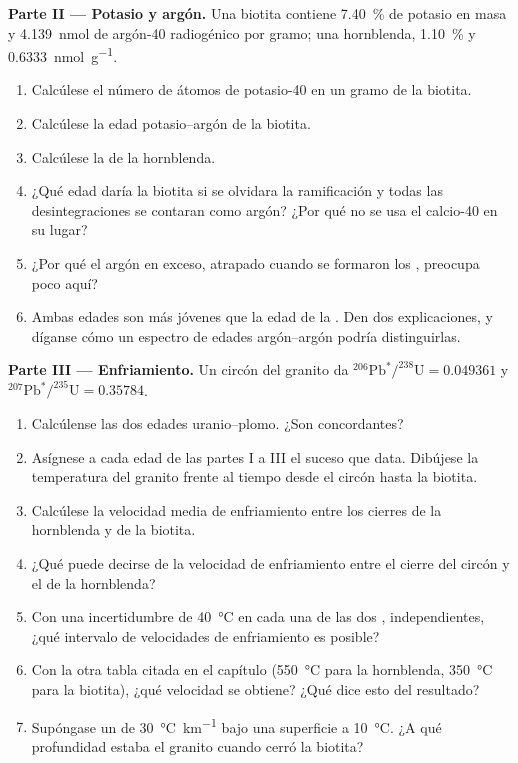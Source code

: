 \begin{problem}
\noindent\textbf{Parte II --- Potasio y argón.} Una biotita contiene
\qty{7.40}{\percent} de potasio en masa y \qty{4.139}{nmol} de argón-40 radiogénico
por gramo; una hornblenda, \qty{1.10}{\percent} y \qty{0.6333}{nmol.g^{-1}}.
\begin{enumerate}[resume]
  \item Calcúlese el número de átomos de potasio-40 en un gramo de la biotita.
  \item Calcúlese la edad potasio--argón de la biotita.
  \item Calcúlese la de la hornblenda.
  \item ¿Qué edad daría la biotita si se olvidara la ramificación y todas las
        desintegraciones se contaran como argón? ¿Por qué no se usa el calcio-40 en su lugar?
  \item ¿Por qué el argón en exceso, atrapado cuando se formaron los ,
        preocupa poco aquí?
  \item Ambas edades son más jóvenes que la edad de la . Den dos
        explicaciones, y díganse cómo un espectro de edades argón--argón podría distinguirlas.
\end{enumerate}

\noindent\textbf{Parte III --- Enfriamiento.} Un circón del granito da
$^{206}\mathrm{Pb}^*/^{238}\mathrm{U} = 0.049361$ y
$^{207}\mathrm{Pb}^*/^{235}\mathrm{U} = 0.35784$.
\begin{enumerate}[resume]
  \item Calcúlense las dos edades uranio--plomo. ¿Son concordantes?
  \item Asígnese a cada edad de las partes I a III el suceso que data. Dibújese la
        temperatura del granito frente al tiempo desde el circón hasta la biotita.
  \item Calcúlese la velocidad media de enfriamiento entre los cierres de la
        hornblenda y de la biotita.
  \item ¿Qué puede decirse de la velocidad de enfriamiento entre el cierre del
        circón y el de la hornblenda?
  \item Con una incertidumbre de \qty{40}{\celsius} en cada una de las dos
        , independientes, ¿qué intervalo de velocidades de enfriamiento es posible?
  \item Con la otra tabla citada en el capítulo (\qty{550}{\celsius} para la
        hornblenda, \qty{350}{\celsius} para la biotita), ¿qué velocidad se obtiene? ¿Qué dice esto del resultado?
  \item Supóngase un  de \qty{30}{\celsius.km^{-1}} bajo una superficie a
        \qty{10}{\celsius}. ¿A qué profundidad estaba el granito cuando cerró la biotita?
\end{enumerate}


\end{problem}
